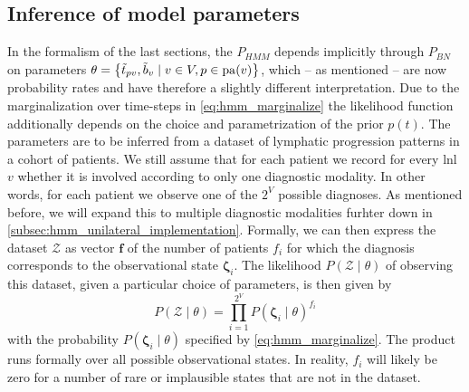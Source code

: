 \documentclass[../ms.tex]{subfiles}
\begin{document}
\subsection{Inference of model parameters}
\label{subsec:hmm_inference}

In the formalism of the last sections, the $P_{HMM}$ depends implicitly through $P_{BN}$ on parameters $\theta = \left\{ \Tilde{t}_{pv} , \Tilde{b}_v \mid v \in V , p \in \operatorname{pa}(v) \right\}$, which – as mentioned – are now probability rates and have therefore a slightly different interpretation. Due to the marginalization over time-steps in \cref{eq:hmm_marginalize} the likelihood function additionally depends on the choice and parametrization of the prior $p(t)$. The parameters are to be inferred from a dataset of lymphatic progression patterns in a cohort of patients. We still assume that for each patient we record for every \gls{lnl} $v$ whether it is involved according to only one diagnostic modality. In other words, for each patient we observe one of the $2^V$ possible diagnoses. As mentioned before, we will expand this to multiple diagnostic modalities furhter down in \cref{subsec:hmm_unilateral_implementation}. Formally, we can then express the dataset $\boldsymbol{\mathcal{Z}}$ as vector $\mathbf{f}$ of the number of patients $f_i$ for which the diagnosis corresponds to the observational state $\boldsymbol{\zeta}_i$. The likelihood $P \left( \boldsymbol{\mathcal{Z}} \mid \theta \right)$ of observing this dataset, given a particular choice of parameters, is then given by
%
\begin{equation}
    P \left( \boldsymbol{\mathcal{Z}} \mid \theta \right) = \prod_{i=1}^{2^V}{P \left( \boldsymbol{\zeta}_i \mid \theta \right)^{f_i}}
\end{equation}
%
with the probability $P \left( \boldsymbol{\zeta}_i \mid \theta \right)$ specified by \cref{eq:hmm_marginalize}. The product runs formally over all possible observational states. In reality, $f_i$ will likely be zero for a number of rare or implausible states that are not in the dataset.
\end{document}
